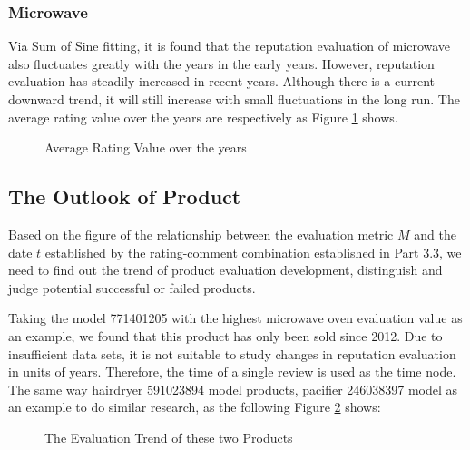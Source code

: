 \documentclass{mcmthesis}
\begin{document}
\subsubsection{Microwave}
Via Sum of Sine fitting, it is found that the reputation evaluation of microwave also fluctuates greatly with the years in the early years. However, reputation evaluation has steadily increased in recent years. Although there is a current downward trend, it will still increase with small fluctuations in the long run. The average rating value over the years are respectively as Figure \ref{fig:1} shows.

\begin{figure}[htbp]
	\centering
	\qquad
	\caption{Average Rating Value over the years}
	\label{fig:1}
\end{figure}
\subsection{The Outlook of Product}
Based on the figure of the relationship between the evaluation metric $ M $ and the date $ t $ established by the rating-comment combination established in Part 3.3, we need to find out the trend of product evaluation development, distinguish and judge potential successful or failed products.

Taking the model 771401205 with the highest microwave oven evaluation value as an example, we found that this product has only been sold since 2012. Due to insufficient data sets, it is not suitable to study changes in reputation evaluation in units of years. Therefore, the time of a single review is used as the time node. The same way hairdryer 591023894 model products, pacifier 246038397  model as an example to do similar research, as the following Figure \ref{fig:4} shows:

\begin{figure}[htbp]
	\centering
	\qquad
	\caption{The Evaluation Trend of these two Products}
	\label{fig:4}
\end{figure}
\end{document}
